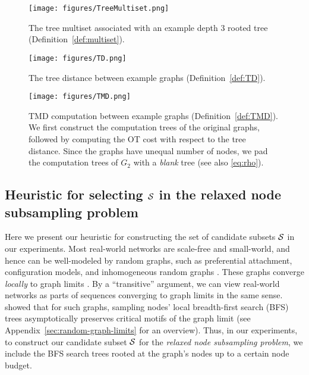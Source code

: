 \begin{figure}
    \centering
    \texttt{[image: figures/TreeMultiset.png]}
    \caption{The tree multiset associated with an example depth 3 rooted tree (Definition~\ref{def:multiset}).}
    \label{fig:multiset}
\end{figure}

\begin{figure}[ht]
    \centering
    \texttt{[image: figures/TD.png]}
    \caption{The tree distance between example graphs (Definition~\ref{def:TD}).}
    \label{fig:td}
\end{figure}

\begin{figure}[ht]
    \centering
    \texttt{[image: figures/TMD.png]}
    \caption{TMD computation between example graphs (Definition~\ref{def:TMD}). We first construct the computation trees of the original graphs, followed by computing the OT cost with respect to the tree distance. Since the graphs have unequal number of nodes, we pad the computation trees of $G_2$ with a \emph{blank} tree (see also \eqref{eq:rho}).}
    \label{fig:tmd}
\end{figure}

\subsection{Heuristic for selecting $\mathcal S$ in the relaxed node subsampling problem}\label{sec:heuristic}

Here we present
our heuristic for constructing the set of candidate subsets $\mathcal S$ in our experiments. Most real-world networks are scale-free and small-world, and hence can be well-modeled by random graphs, such as preferential attachment, configuration models, and {inhomogeneous} random graphs \citep{bollobas2004coupling,newman1999scaling}. {These} 
graphs
converge \textit{locally} to {graph limits} \citep[Vol.~2, Ch.~2]{van2024random}. By a ``transitive'' argument, {we can} view real-world networks as parts of sequences converging to graph limits in the same sense. 
\citet{alimohammadi2023local} showed that for 
such graphs, sampling {nodes'} {local} breadth-first search (BFS) trees asymptotically preserves critical motifs of the {graph limit} (see Appendix~\ref{sec:random-graph-limits} for an overview). Thus, in our experiments, to construct our candidate subset $\mathcal S$ for the \emph{relaxed node subsampling problem}, we include the BFS search trees rooted at the graph's nodes up to a certain node budget.  

